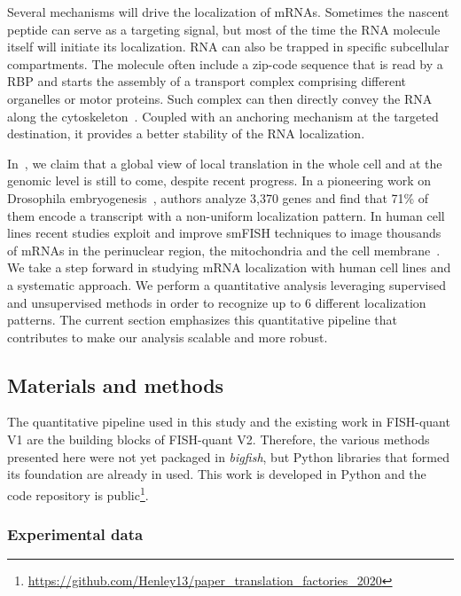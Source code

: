 Several mechanisms will drive the localization of \ac{mRNA}s.
Sometimes the nascent peptide can serve as a targeting signal, but most of the time the \ac{RNA} molecule itself will initiate its localization.
\ac{RNA} can also be trapped in specific subcellular compartments.
The molecule often include a zip-code sequence that is read by a \ac{RBP} and starts the assembly of a transport complex comprising different organelles or motor proteins.
Such complex can then directly convey the \ac{RNA} along the cytoskeleton~\cite{Blower_2013}.
Coupled with an anchoring mechanism at the targeted destination, it provides a better stability of the \ac{RNA} localization.

In~\cite{CHOUAIB_2020}, we claim that a global view of local translation in the whole cell and at the genomic level is still to come, despite recent progress.
In a pioneering work on Drosophila embryogenesis~\cite{lecuyer_global_2007}, authors analyze 3,370 genes and find that 71\% of them encode a transcript with a non-uniform localization pattern.
In human cell lines recent studies exploit and improve \ac{smFISH} techniques to image thousands of \ac{mRNA}s in the perinuclear region, the mitochondria and the cell membrane~\cite{battich_image-based_2013, Chen_2015, eng_seqfish_2019, Xia_2019}.
We take a step forward in studying \ac{mRNA} localization with human cell lines and a systematic approach.
We perform a quantitative analysis leveraging supervised and unsupervised methods in order to recognize up to 6 different localization patterns.
The current section emphasizes this quantitative pipeline that contributes to make our analysis scalable and more robust.

\subsection{Materials and methods}
\label{subsec:materials_general_pattern}

The quantitative pipeline used in this study and the existing work in FISH-quant V1 are the building blocks of FISH-quant V2.
Therefore, the various methods presented here were not yet packaged in \emph{bigfish}, but Python libraries that formed its foundation are already in used.
This work is developed in Python and the code repository is public\footnote{\url{https://github.com/Henley13/paper_translation_factories_2020}}.

\subsubsection{Experimental data}

